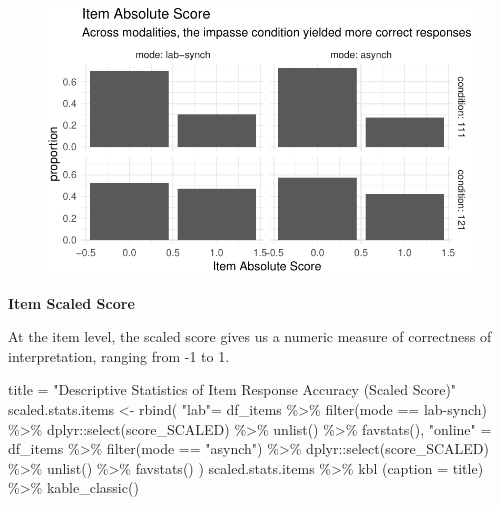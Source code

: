 \documentclass[
  letterpaper,
  DIV=11,
  numbers=noendperiod]{scrreprt}
\newenvironment{Shaded}{\begin{snugshade}}{\end{snugshade}}
\newcommand{\AttributeTok}[1]{\textcolor[rgb]{0.40,0.45,0.13}{#1}}
\newcommand{\FunctionTok}[1]{\textcolor[rgb]{0.28,0.35,0.67}{#1}}
\newcommand{\NormalTok}[1]{\textcolor[rgb]{0.00,0.23,0.31}{#1}}
\newcommand{\OtherTok}[1]{\textcolor[rgb]{0.00,0.23,0.31}{#1}}
\newcommand{\SpecialCharTok}[1]{\textcolor[rgb]{0.37,0.37,0.37}{#1}}
\newcommand{\StringTok}[1]{\textcolor[rgb]{0.13,0.47,0.30}{#1}}
\begin{document}
\begin{figure}[H]

{\centering \includegraphics{analysis/SGC3A/3_sgc3A_description_files/figure-pdf/unnamed-chunk-24-1.pdf}

}

\end{figure}

\textbf{Item Scaled Score}

At the item level, the scaled score gives us a numeric measure of
correctness of interpretation, ranging from -1 to 1.

\begin{Shaded}
\begin{Highlighting}[]
\NormalTok{title }\OtherTok{=} \StringTok{"Descriptive Statistics of Item Response Accuracy (Scaled Score)"}
\NormalTok{scaled.stats.items }\OtherTok{\textless{}{-}} \FunctionTok{rbind}\NormalTok{(}
  \StringTok{"lab"}\OtherTok{=}\NormalTok{ df\_items }\SpecialCharTok{\%\textgreater{}\%} \FunctionTok{filter}\NormalTok{(mode }\SpecialCharTok{==} \StringTok{\textquotesingle{}lab{-}synch\textquotesingle{}}\NormalTok{) }\SpecialCharTok{\%\textgreater{}\%}\NormalTok{ dplyr}\SpecialCharTok{::}\FunctionTok{select}\NormalTok{(score\_SCALED) }\SpecialCharTok{\%\textgreater{}\%} \FunctionTok{unlist}\NormalTok{() }\SpecialCharTok{\%\textgreater{}\%} \FunctionTok{favstats}\NormalTok{(),}
  \StringTok{"online"} \OtherTok{=}\NormalTok{ df\_items }\SpecialCharTok{\%\textgreater{}\%} \FunctionTok{filter}\NormalTok{(mode }\SpecialCharTok{==} \StringTok{"asynch"}\NormalTok{) }\SpecialCharTok{\%\textgreater{}\%}\NormalTok{ dplyr}\SpecialCharTok{::}\FunctionTok{select}\NormalTok{(score\_SCALED) }\SpecialCharTok{\%\textgreater{}\%} \FunctionTok{unlist}\NormalTok{() }\SpecialCharTok{\%\textgreater{}\%} \FunctionTok{favstats}\NormalTok{()}
\NormalTok{) }
\NormalTok{scaled.stats.items }\SpecialCharTok{\%\textgreater{}\%} \FunctionTok{kbl}\NormalTok{ (}\AttributeTok{caption =}\NormalTok{ title) }\SpecialCharTok{\%\textgreater{}\%} \FunctionTok{kable\_classic}\NormalTok{()}
\end{Highlighting}
\end{Shaded}
\end{document}
